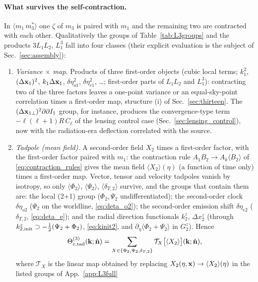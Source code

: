 \paragraph{What survives the self-contraction.}  In $\langle m_{1}\,m_3^*\rangle$ one $\zeta$ of $m_3$ is paired with $m_1$ and the
remaining two are contracted with each other.  Qualitatively the groups of Table~\ref{tab:L3groups} and the products $3L_1L_2$,
$L_1^3$ fall into four classes (their explicit evaluation is the subject of Sec.~\ref{sec:assembly}):
\begin{enumerate}
\item[(i)] \emph{Variance $\times$ map.}  Products of three first-order objects (cubic local terms; $k_1^2$, $(\Delta\mathbf x_1)^2$, $k_1\Delta\mathbf x_1$,
$\delta\eta_{o1}^2$, $\delta\eta_{e1}^2$, \ldots; first-order parts of $L_1L_2$ and $L_1^3$): contracting two of the three factors leaves a
one-point variance or an equal-sky-point correlation times a first-order map, structure (i) of Sec.~\ref{sec:thirteen}.  The
$(\Delta\mathbf x_{1\perp})^2\partial\partial I_1$ group, for instance, produces the convergence-type term $-\ell(\ell+1)R\,C_\ell$ of the lensing
control case (Sec.~\ref{sec:lensing_control}), now with the radiation-era deflection correlated with the source.
\item[(ii)] \emph{Tadpole (mean field).}  A second-order field $X_2$ times a first-order factor, with the first-order factor paired with
$m_1$: the contraction rule $A_1B_2\to A_k\langle B_2\rangle$ of \eqref{eq:contraction_rules} gives the mean field $\langle X_2\rangle(\eta)$ (a
function of time only) times a first-order map.  Vector, tensor and velocity tadpoles vanish by isotropy, so only $\langle\Phi_2\rangle$,
$\langle\Psi_2\rangle$, $\langle\delta_{T,2}\rangle$ survive, and the groups that contain them are: the local (2+1) group ($\Phi_2,\Psi_2$ undifferentiated);
the second-order clock $\delta\eta_{o2}$ ($\Psi_2$ on the worldline, \eqref{eq:deta_o2}); the second-order emission shift $\delta\eta_{e2}$ ($\delta_{T,2}$,
\eqref{eq:deta_e}); and the radial direction functionals $k^z_2$, $\Delta x^z_2$ (through $k^z_{2,\rm init}\supset-\tfrac12(\Psi_2+\Phi_2)$, \eqref{eq:kinit2},
and $\partial_\eta\langle\Phi_2+\Psi_2\rangle$ in $G^z_2$).  Hence
\begin{equation}
\Theta^{(3)}_{c,\rm tad}(\mathbf k;\hat{\mathbf n})=\sum_{X\in\{\Phi_2,\Psi_2,\delta_{T,2}\}}\mathcal T_X\big[\langle X_2\rangle\big](\mathbf k;\hat{\mathbf n}),
\label{eq:tadgroup}
\end{equation}
where $\mathcal T_X$ is the linear map obtained by replacing $X_2(\eta,\mathbf x)\to\langle X_2\rangle(\eta)$ in the listed groups of App.~\ref{app:L3full}

\end{enumerate}

